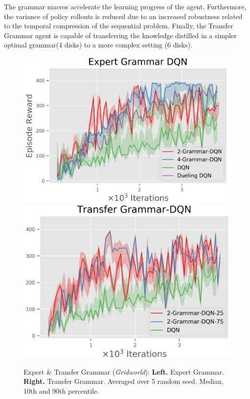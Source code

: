 \documentclass[10pt,letterpaper]{article}
\begin{document}
The grammar macros accelerate the learning progress of the agent. Furthermore, the variance of policy rollouts is reduced due to an increased robustness related to the temporal compression of the sequential problem.
Finally, the Transfer Grammar agent is capable of transferring the knowledge distilled in a simpler optimal grammar(4 disks) to a more complex setting (6 disks).  

\begin{figure}[H]
  \includegraphics[width=\linewidth]{figures/grammar_dqn_gridworld_expert}
\endminipage\hfill
{}
  \includegraphics[width=\linewidth]{figures/grammar_dqn_gridworld_transfer}
\endminipage\hfill
\caption{Expert \& Transfer Grammar (\textit{Gridworld}): \textbf{Left.} Expert Grammar. \textbf{Right.} Transfer Grammar. Averaged over 5 random seed. Median, 10th and 90th percentile.}
\label{fig:expert_grammar_grid}
\end{figure}
\end{document}
